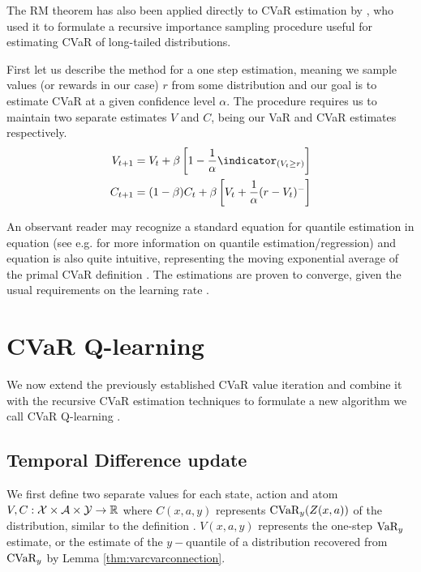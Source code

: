 The RM theorem has also been applied directly to CVaR estimation by \citet{bardou2009recursive}, who used it to formulate a recursive importance sampling procedure useful for estimating CVaR of long-tailed distributions.

First let us describe the method for a one step estimation, meaning we sample values (or rewards in our case) $r$ from some distribution and our goal is to estimate CVaR at a given confidence level $\alpha$. The procedure requires us to maintain two separate estimates $V$ and $C$, being our VaR and CVaR estimates respectively.
\begin{align}
V_{t+1} &= V_{t} + \beta \bsquare{1-\dfrac{1}{\alpha}\indicator_{(V_t \ge r)}}\label{eqn:varestimate}\\
C_{t+1} &= (1-\beta)C_t + \beta \bsquare{V_t + \dfrac{1}{\alpha}(r-V_t)^-}\label{eqn:cvarestimate}
\end{align}

An observant reader may recognize a standard equation for quantile estimation in equation  (see e.g. \cite{quantile} for more information on quantile estimation/regression) and equation  is also quite intuitive, representing the moving exponential average of the primal CVaR definition . The estimations are proven to converge, given the usual requirements on the learning rate  \citep{bardou2009recursive}.


\section{CVaR Q-learning}\label{sec:qcvar}

We now extend the previously established CVaR value iteration and combine it with the recursive CVaR estimation techniques to formulate a new algorithm we call CVaR Q-learning .
\subsection{Temporal Difference update}
We first define two separate values for each state, action and atom $V, C: \mathcal{X}\times\mathcal{A}\times\mathcal{Y}\to\mathbb{R}$ where $C(x, a, y)$ represents $\text{CVaR}_y(Z(x, a))$ of the distribution, similar to the definition . $V(x, a, y)$ represents the one-step $\text{VaR}_y$ estimate, or the estimate of the $y-$quantile of a distribution recovered from $\text{CVaR}_y$ by Lemma \ref{thm:varcvarconnection}.

